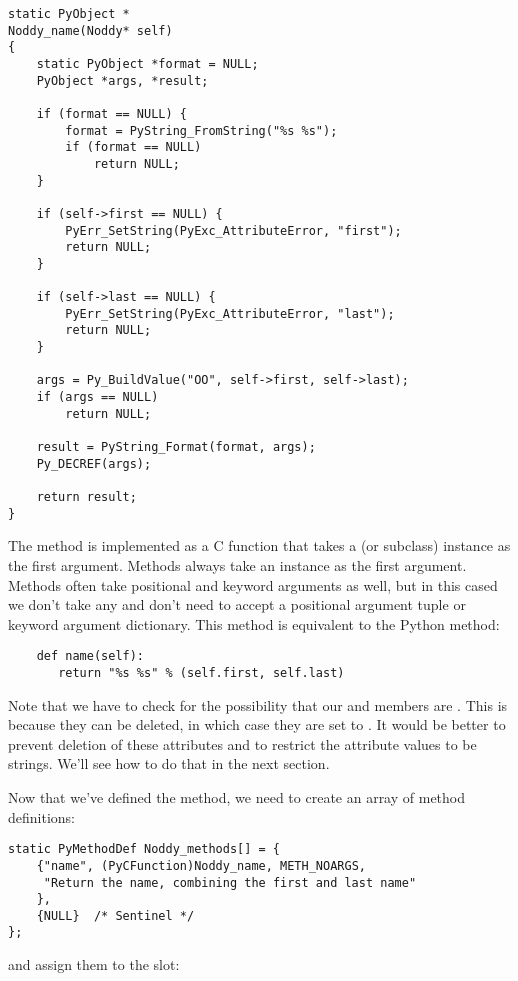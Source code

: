 \begin{verbatim}
static PyObject *
Noddy_name(Noddy* self)
{
    static PyObject *format = NULL;
    PyObject *args, *result;

    if (format == NULL) {
        format = PyString_FromString("%s %s");
        if (format == NULL)
            return NULL;
    }

    if (self->first == NULL) {
        PyErr_SetString(PyExc_AttributeError, "first");
        return NULL;
    }

    if (self->last == NULL) {
        PyErr_SetString(PyExc_AttributeError, "last");
        return NULL;
    }

    args = Py_BuildValue("OO", self->first, self->last);
    if (args == NULL)
        return NULL;

    result = PyString_Format(format, args);
    Py_DECREF(args);
    
    return result;
}
\end{verbatim}

The method is implemented as a C function that takes a  (or
 subclass) instance as the first argument.  Methods
always take an instance as the first argument. Methods often take
positional and keyword arguments as well, but in this cased we don't
take any and don't need to accept a positional argument tuple or
keyword argument dictionary. This method is equivalent to the Python
method:

\begin{verbatim}
    def name(self):
       return "%s %s" % (self.first, self.last)
\end{verbatim}

Note that we have to check for the possibility that our 
and  members are \NULL.  This is because they can be
deleted, in which case they are set to \NULL.  It would be better to
prevent deletion of these attributes and to restrict the attribute
values to be strings.  We'll see how to do that in the next section.

Now that we've defined the method, we need to create an array of
method definitions:

\begin{verbatim}
static PyMethodDef Noddy_methods[] = {
    {"name", (PyCFunction)Noddy_name, METH_NOARGS,
     "Return the name, combining the first and last name"
    },
    {NULL}  /* Sentinel */
};
\end{verbatim}

and assign them to the  slot:

